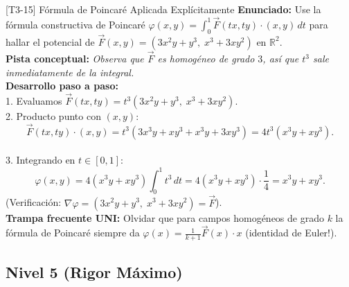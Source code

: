 \documentclass[11pt,a4paper]{article}
\begin{document}
\begin{ejerciciobox}{[T3-15] Fórmula de Poincaré Aplicada Explícitamente}
\textbf{Enunciado:} Use la fórmula constructiva de Poincaré $\varphi(x,y) = \int_0^1 \vec{F}(tx, ty)\cdot(x,y)\,dt$ para hallar el potencial de $\vec{F}(x,y) = (3x^2y + y^3,\; x^3 + 3xy^2)$ en $\mathbb{R}^2$.\\[0.2cm]
\textbf{Pista conceptual:} \emph{Observa que $\vec{F}$ es homogéneo de grado $3$, así que $t^3$ sale inmediatamente de la integral.}\\[0.2cm]
\textbf{Desarrollo paso a paso:}\\
1. Evaluamos $\vec{F}(tx, ty) = t^3(3x^2y + y^3,\; x^3 + 3xy^2)$.\\
2. Producto punto con $(x,y)$:\\
$$\vec{F}(tx, ty)\cdot(x,y) = t^3(3x^3y + xy^3 + x^3y + 3xy^3) = 4t^3(x^3y + xy^3).$$\\
3. Integrando en $t \in [0,1]$:\\
$$\varphi(x,y) = 4(x^3y + xy^3)\int_0^1 t^3\,dt = 4(x^3y + xy^3)\cdot\frac{1}{4} = x^3y + xy^3.$$ (Verificación: $\nabla\varphi = (3x^2y+y^3,\; x^3+3xy^2) = \vec{F}$).\\[0.2cm]
\textbf{Trampa frecuente UNI:} Olvidar que para campos homogéneos de grado $k$ la fórmula de Poincaré siempre da $\varphi(x) = \frac{1}{k+1}\vec{F}(x)\cdot x$ (identidad de Euler!).
\end{ejerciciobox}

\subsection{Nivel 5 (Rigor Máximo)}
\end{document}
